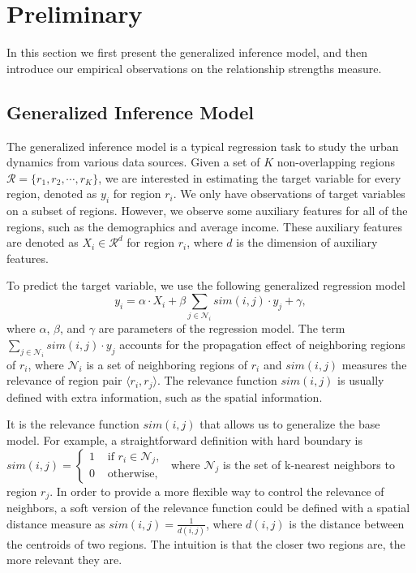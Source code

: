 \section{Preliminary}
\label{sec:prel}


In this section we first present the generalized inference model, and then introduce our empirical observations on the relationship strengths measure.


\subsection{Generalized Inference Model}

The generalized inference model is a typical regression task to study the urban dynamics from various data sources. Given a set of $K$ non-overlapping regions $\mathcal{R} = \{ r_1, r_2, \cdots, r_K \}$, we are interested in estimating the target variable for every region, denoted as $y_i$ for region $r_i$. We only have observations of target variables on a subset of regions. However, we observe some auxiliary features for all of the regions, such as the demographics and average income. These auxiliary features are denoted as $X_i \in \mathcal{R}^d$ for region $r_i$, where $d$ is the dimension of auxiliary features.


To predict the target variable, we use the following generalized regression model
\begin{equation}
\label{eq:basemodel}
y_i = \alpha \cdot X_i + \beta \sum_{j \in \mathcal{N}_i} sim(i,j) \cdot y_j + \gamma,
\end{equation}
where $\alpha$, $\beta$, and $\gamma$ are parameters of the regression model. The term $\sum_{j \in \mathcal{N}_i} sim(i,j) \cdot y_j$ accounts for the propagation effect of neighboring regions of $r_i$, where $\mathcal{N}_i$ is a set of neighboring regions of $r_i$ and $sim(i,j)$ measures the relevance of region pair $\langle r_i, r_j \rangle$. The relevance function $sim(i,j)$ is usually defined with extra information, such as the spatial information.


It is the relevance function $sim(i,j)$ that allows us to generalize the base model. For example, a straightforward definition with hard boundary is
$sim(i,j) = \left\{ \begin{array}{cc}
1 & \text{ if $r_i \in \mathcal{N}_j$, } \\
0 & \text{ otherwise,}
\end{array}\right.$
where $\mathcal{N}_j$ is the set of k-nearest neighbors to region $r_j$. In order to provide a more flexible way to control the relevance of neighbors, a soft version of the relevance function could be defined with a spatial distance measure as $sim(i,j) = \frac{1}{d(i,j)}$,
where $d(i,j)$ is the distance between the centroids of two regions. The intuition is that the closer two regions are, the more relevant they are.


